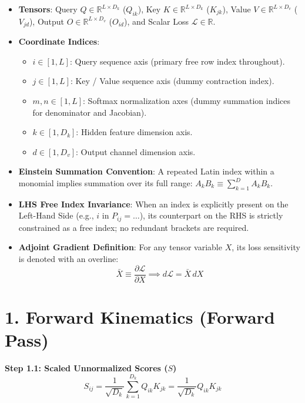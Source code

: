 \documentclass[11pt,a4paper]{article}
\begin{document}
\begin{itemize}
    \item \textbf{Tensors}: Query $Q \in \mathbb{R}^{L \times D_k}$ ($Q_{ik}$), Key $K \in \mathbb{R}^{L \times D_k}$ ($K_{jk}$), Value $V \in \mathbb{R}^{L \times D_v}$ ($V_{jd}$), Output $O \in \mathbb{R}^{L \times D_v}$ ($O_{id}$), and Scalar Loss $\mathcal{L} \in \mathbb{R}$.
    \item \textbf{Coordinate Indices}:
    \begin{itemize}
        \item $i \in [1, L]$: Query sequence axis (primary free row index throughout).
        \item $j \in [1, L]$: Key / Value sequence axis (dummy contraction index).
        \item $m, n \in [1, L]$: Softmax normalization axes (dummy summation indices for denominator and Jacobian).
        \item $k \in [1, D_k]$: Hidden feature dimension axis.
        \item $d \in [1, D_v]$: Output channel dimension axis.
    \end{itemize}
    \item \textbf{Einstein Summation Convention}: A repeated Latin index within a monomial implies summation over its full range: $A_k B_k \equiv \sum_{k=1}^D A_k B_k$.
    \item \textbf{LHS Free Index Invariance}: When an index is explicitly present on the Left-Hand Side (e.g., $i$ in $P_{ij} = \dots$), its counterpart on the RHS is strictly constrained as a free index; no redundant brackets are required.
    \item \textbf{Adjoint Gradient Definition}: For any tensor variable $X$, its loss sensitivity is denoted with an overline:
    $$\bar{X} \equiv \frac{\partial \mathcal{L}}{\partial X} \implies d\mathcal{L} = \bar{X} \, dX$$
\end{itemize}

\section*{1. Forward Kinematics (Forward Pass)}

\textbf{Step 1.1: Scaled Unnormalized Scores ($S$)}
$$S_{ij} = \frac{1}{\sqrt{D_k}} \sum_{k=1}^{D_k} Q_{ik} K_{jk} = \frac{1}{\sqrt{D_k}} Q_{ik} K_{jk}$$
\end{document}

